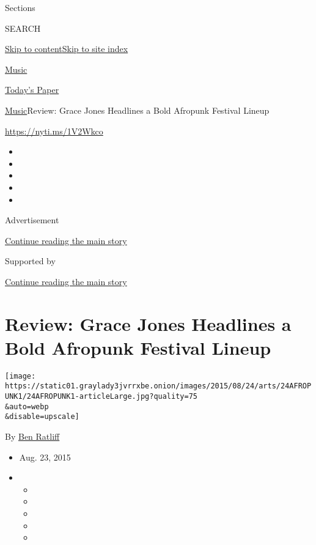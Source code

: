 Sections

SEARCH

\protect\hyperlink{site-content}{Skip to
content}\protect\hyperlink{site-index}{Skip to site index}

\href{https://www.nytimes3xbfgragh.onion/section/arts/music}{Music}

\href{https://myaccount.nytimes3xbfgragh.onion/auth/login?response_type=cookie\&client_id=vi}{}

\href{https://www.nytimes3xbfgragh.onion/section/todayspaper}{Today's
Paper}

\href{/section/arts/music}{Music}\textbar{}Review: Grace Jones Headlines
a Bold Afropunk Festival Lineup

\url{https://nyti.ms/1V2Wkco}

\begin{itemize}
\item
\item
\item
\item
\item
\end{itemize}

Advertisement

\protect\hyperlink{after-top}{Continue reading the main story}

Supported by

\protect\hyperlink{after-sponsor}{Continue reading the main story}

\hypertarget{review-grace-jones-headlines-a-bold-afropunk-festival-lineup}{%
\section{Review: Grace Jones Headlines a Bold Afropunk Festival
Lineup}\label{review-grace-jones-headlines-a-bold-afropunk-festival-lineup}}

\texttt{[image: https://static01.graylady3jvrrxbe.onion/images/2015/08/24/arts/24AFROPUNK1/24AFROPUNK1-articleLarge.jpg?quality=75\\\&auto=webp\\\&disable=upscale]}

By \href{http://www.nytimes3xbfgragh.onion/by/ben-ratliff}{Ben Ratliff}

\begin{itemize}
\item
  Aug. 23, 2015
\item
  \begin{itemize}
  \item
  \item
  \item
  \item
  \item
  \end{itemize}
\end{itemize}

